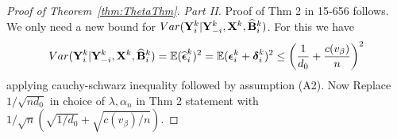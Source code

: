 \documentclass[12pt, letterpaper]{article}
\numberwithin{equation}{section}
\begin{document}
\begin{proof}[Proof of Theorem~\ref{thm:ThetaThm}]
%
%
%

\textit{Part II.} Proof of Thm 2 in 15-656 follows. We only need a new bound for $Var ({\mathbf{Y}}_i^k | {\mathbf{Y}}_{-i}^k, {\mathbf{X}}^k, \widehat {{\mathbf{B}}}_i^k)$. For this we have
%
$$ Var ({\mathbf{Y}}_i^k | {\mathbf{Y}}_{-i}^k, {\mathbf{X}}^k, \widehat {{\mathbf{B}}}_i^k) = {\mathbb{E}} (\widehat {{\boldsymbol{\epsilon}}}_i^k)^2
= {\mathbb{E}} ( {\boldsymbol{\epsilon}}_i^k + {\boldsymbol{\delta}}_i^k)^2
\leq \left( \frac{1}{d_0} + \frac{c(v_\beta)}{n} \right)^2
$$
%
applying cauchy-schwarz inequality followed by assumption (A2). Now Replace $1/\sqrt{n d_0}$ in choice of $\lambda, \alpha_n$ in Thm 2 statement with $1/\sqrt{n} (\sqrt{1/d_0} + \sqrt{c(v_\beta)/ n})$.

\end{proof}
\end{document}
